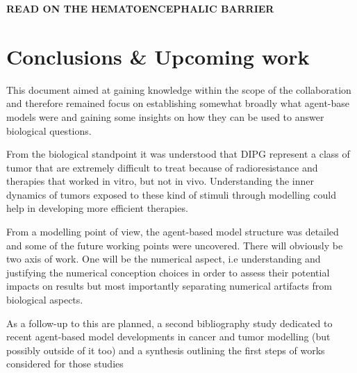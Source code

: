 \documentclass[11pt,a4paper]{article}
\begin{document}
\textbf{READ ON THE HEMATOENCEPHALIC BARRIER}

\section*{Conclusions \& Upcoming work}
This document aimed at gaining knowledge within the scope of the collaboration and therefore remained focus on establishing somewhat broadly what agent-base models were and gaining some insights on how they can be used to answer biological questions. \newline

From the biological standpoint it was understood that DIPG represent a class of tumor that are extremely difficult to treat because of radioresistance and therapies that worked in vitro, but not in vivo. Understanding the inner dynamics of tumors exposed to these kind of stimuli through modelling could help in developing more efficient therapies.\newline 

From a modelling point of view, the agent-based model structure was detailed and some of the future working points were uncovered. There will obviously be two axis of work. One will be the numerical aspect, i.e understanding and justifying the numerical conception choices in order to assess their potential impacts on results but most importantly separating numerical artifacts from biological aspects.

As a follow-up to this are planned, a second bibliography study dedicated to recent agent-based model developments in cancer and tumor modelling (but possibly outside of it too) and a synthesis outlining the first steps of works considered for those studies
\end{document}
